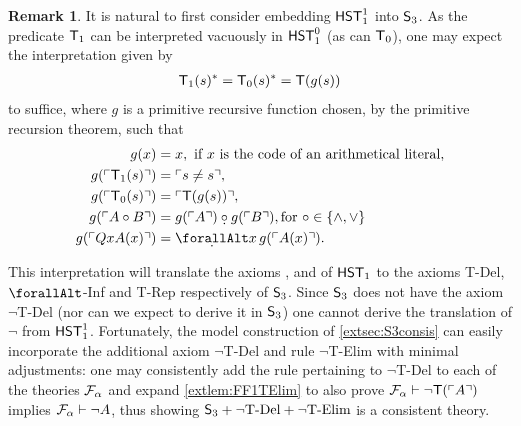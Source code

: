 \documentclass[UKenglish,cleveref,DIV=12]{scrartcl}
\let\forall\forallAlt
\theoremstyle{definition}
\theoremstyle{definition}
\newtheorem{remark}{Remark}
\begin{document}
\begin{remark}\label{extrem:S3} It is natural to first consider embedding
$\mathsf{HST}_1^1$ into $\mathsf{S}_3$. As the predicate $\mathsf{T}_1$ can be interpreted vacuously
in $\mathsf{HST}_1^0$ (as can $\mathsf{T}_0$), one may expect the interpretation given by
\begin{align*}
 \mathsf{T}_1(s)^*=\mathsf{T}_0(s)^*= \mathsf{T}(g(s))
\end{align*}
to suffice, where $g$ is a primitive recursive function chosen, by the primitive recursion theorem, such that
\begin{align*}
 g(x)&=x, \text{ if $x$ is the code of an arithmetical literal},\\
 g(\gn{\T_1(s)})&=\gn{s\neq s},\\
 g(\gn{\T_0(s)})&=\gn{\T(g(s))},\\
 g(\gn{A\mathbin\circ B})&=g(\gn A)\mathbin{\subdot\circ} g(\gn B), \text{for $\circ\in\{\land,\lor\}$}\\
 g(\gn{QxA(x)})&=\dfa x\, g(\gn{A(x)}).
\end{align*}

This interpretation will translate the axioms , 
and  of $\mathsf{HST}_1$ to the axioms T-Del, $\forall$-Inf and T-Rep
respectively of $\mathsf{S}_3$. Since $\mathsf{S}_3$ does not have the axiom
$\lnot$T-Del (nor can we expect to derive it in $\mathsf{S}_3$) one cannot derive
the translation of $\lnot$ from $\mathsf{HST}_1^1$. Fortunately, the model
construction of \cref{extsec:S3consis} can easily incorporate the additional
axiom $\lnot$T-Del and rule $\lnot$T-Elim with minimal adjustments: one
may consistently add the rule pertaining to $\lnot$T-Del to each of the theories
$\mathcal{F}_\alpha$ and expand \cref{extlem:FF1TElim} to also prove $\mathcal{F}_\alpha\vdash\lnot
\mathsf{T}(\ulcorner{A}\urcorner)$ implies $\mathcal{F}_\alpha\vdash\lnot A$, thus showing $\mathsf{S}_3+\text{$\lnot$T-Del}+\text{$\lnot$T-Elim}$ is a consistent theory.


\end{remark}
\end{document}
